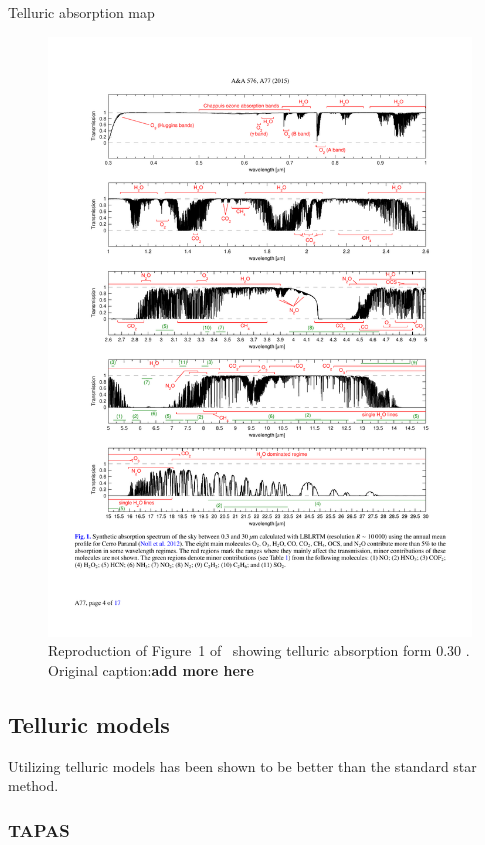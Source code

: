

Telluric absorption map
\begin{figure}
    \centering
    \includegraphics[width=0.9\linewidth]{figures/advanced_material/cropped_molecfit_absorbtion}
    \caption{Reproduction of Figure~1 of~\citet{smette_molecfit_2015} showing telluric absorption form 0.30 \um.
        Original caption:\textbf{add more here}}
    \label{fig:croppedmolecfitabsorbtion}
\end{figure}




\subsection{Telluric models}

Utilizing telluric models has been shown to be better than the standard star method.
\subsubsection{TAPAS}

